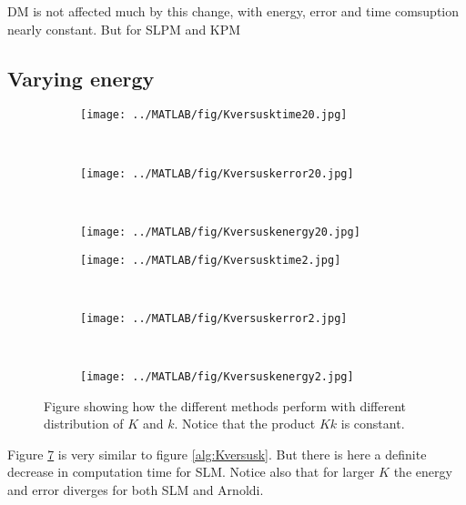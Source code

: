 DM is not affected much by this change, with energy, error and time comsuption nearly constant. But for SLPM and KPM 

\subsection{Varying energy}%
\begin{figure}[H]
        \centering
		\begin{subfigure}[b]{0.3\textwidth}
                \texttt{[image: ../MATLAB/fig/Kversusktime20.jpg]}
                \caption{  }
                \label{fig:Kversusktime20}
        \end{subfigure}
        ~
        \begin{subfigure}[b]{0.3\textwidth}
                \texttt{[image: ../MATLAB/fig/Kversuskerror20.jpg]}
                \caption{  }
                \label{fig:Kversuskerror20}
        \end{subfigure}
        ~
        \begin{subfigure}[b]{0.3\textwidth}
                \texttt{[image: ../MATLAB/fig/Kversuskenergy20.jpg]}
                \caption{  }
                \label{fig:Kversuskenergy20}
        \end{subfigure}        
        
        \begin{subfigure}[b]{0.3\textwidth}
                \texttt{[image: ../MATLAB/fig/Kversusktime2.jpg]}
                \caption{  }
                \label{fig:Kversusktime2}
        \end{subfigure}
        ~
        \begin{subfigure}[b]{0.3\textwidth}
                \texttt{[image: ../MATLAB/fig/Kversuskerror2.jpg]}
                \caption{  }
                \label{fig:Kversuskerror2}
        \end{subfigure}
        ~
        \begin{subfigure}[b]{0.3\textwidth}
                \texttt{[image: ../MATLAB/fig/Kversuskenergy2.jpg]}
                \caption{  }
                \label{fig:Kversuskenergy2}
        \end{subfigure}
        \caption{Figure showing how the different methods perform with different distribution of $K$ and $k$. Notice that the product $Kk$ is constant. }
        \label{fig:Kversusk2}
\end{figure}
Figure \ref{fig:Kversusk2} is very similar to figure \ref{alg:Kversusk}. But there is here a definite decrease in computation time for SLM. Notice also that for larger $K$ the energy and error diverges for both SLM and Arnoldi. 


